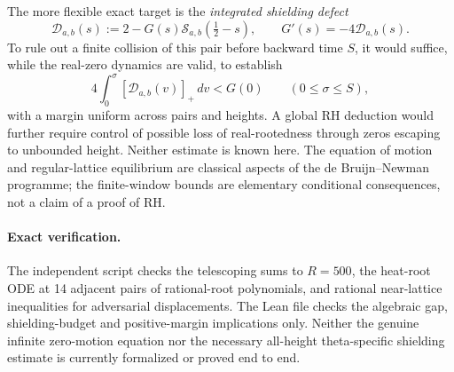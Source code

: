 The more flexible exact target is the
\emph{integrated shielding defect}
\[
\mathcal D_{a,b}(s)
:=2-G(s)\mathcal S_{a,b}(\tfrac12-s),
\qquad G'(s)=-4\mathcal D_{a,b}(s).
\]
To rule out a finite collision of this pair
before backward time $S$, it would suffice,
while the real-zero dynamics are valid, to
establish
\begin{equation}
\boxed{
4\int_0^\sigma
[\mathcal D_{a,b}(v)]_+\,dv<G(0)
\qquad(0\le\sigma\le S),
}
\label{eq:integratedshieldu}
\end{equation}
with a margin uniform across pairs and heights.
A global RH deduction would further require
control of possible loss of real-rootedness
through zeros escaping to unbounded height.
Neither estimate is known here.
The equation of motion and regular-lattice
equilibrium are classical aspects of the
de Bruijn--Newman programme; the finite-window
bounds are elementary conditional consequences,
not a claim of a proof of RH.

\paragraph{Exact verification.}
The independent script
checks the telescoping sums to $R=500$,
the heat-root ODE at 14 adjacent pairs
of rational-root polynomials, and rational
near-lattice inequalities for adversarial
displacements. The Lean file
checks the algebraic gap, shielding-budget
and positive-margin implications only.
Neither the genuine infinite zero-motion
equation nor the necessary all-height
theta-specific shielding estimate is
currently formalized or proved end to end.
